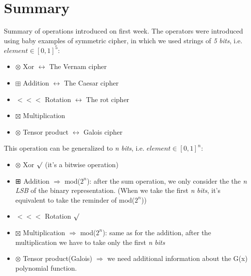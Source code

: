 \documentclass{article}
\begin{document}
\section*{Summary}
Summary of operations introduced on first week. The operators were introduced using baby examples of symmetric cipher, in which we used strings of \textit{5 bits}, i.e. $element \in [0,1]^5$:
\begin{itemize}
\item  $\otimes$ Xor \(\longleftrightarrow\) The Vernam cipher
\item  $\boxplus$ Addition \(\longleftrightarrow\) The Caesar cipher
\item $<<<$ Rotation \(\longleftrightarrow\) The rot cipher 
\item $\boxtimes$ Multiplication
\item  $\otimes$ Tensor product \(\longleftrightarrow\) Galois cipher  
\end{itemize}
This operation can be generalized to \textit{n bits}, i.e. $element \in [0,1]^n$:
\begin{itemize}
\item  $\otimes$ Xor  \(\surd\) (it's a bitwise operation)
\item   ⊞  Addition \(\Rightarrow\) mod($2^{n}$): after the sum operation, we only consider the the \textit{n LSB} of the  binary representation. (When we take the first \textit{n bits}, it's equivalent to take the reminder of mod($2^{n}$))
\item $<<<$ Rotation \(\surd\)
\item $\boxtimes$ Multiplication \(\Rightarrow\) mod($2^{n}$): same as for the addition, after the multiplication we have to take only the first \textit{n bits}
\item $\otimes$ Tensor product(Galois) \(\Rightarrow\) we need additional information about the G(x) polynomial function. 
\end{itemize}

\newpage
\end{document}
